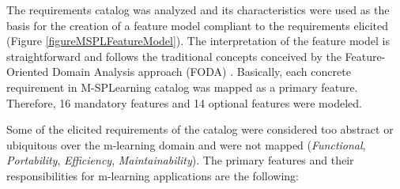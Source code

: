 The requirements catalog was analyzed and its characteristics were used as the basis for the creation of a feature model compliant to the requirements elicited (Figure \ref{figureMSPLFeatureModel}). The interpretation of the feature model is straightforward and follows the traditional concepts conceived by the Feature-Oriented Domain Analysis approach (FODA) \cite{kang90}. Basically, each concrete requirement in M-SPLearning catalog was mapped as a primary feature. Therefore, 16 mandatory features and 14 optional features were modeled.

Some of the elicited requirements of the catalog were considered too abstract or ubiquitous over the m-learning domain and were not mapped (\textit{Functional}, \textit{Portability}, \textit{Efficiency}, \textit{Maintainability}). The primary features and their responsibilities for m-learning applications are the following:

